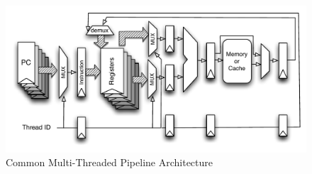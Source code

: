 \begin{figure}
\begin{center}
\includegraphics[scale=.8]{figs/multithreaded_pipeline_block}
\end{center}
\vspace{-30pt}
\caption{Common Multi-Threaded Pipeline Architecture}
\label{fig:multi-thread pipeline simplified}
\end{figure}

